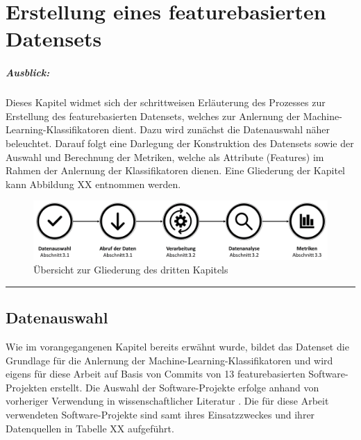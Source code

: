 
\chapter{Erstellung eines featurebasierten Datensets}

\paragraph{Ausblick:}
Dieses Kapitel widmet sich der schrittweisen Erläuterung des Prozesses zur Erstellung des featurebasierten Datensets, welches zur Anlernung der Machine-Learning-Klassifikatoren dient. Dazu wird zunächst die Datenauswahl näher beleuchtet. Darauf folgt eine Darlegung der Konstruktion des Datensets sowie der Auswahl und Berechnung der Metriken, welche als Attribute (Features) im Rahmen der Anlernung der Klassifikatoren dienen. Eine Gliederung der Kapitel kann Abbildung XX entnommen werden.

\begin{figure}[H]
    \centering
    \includegraphics[width=\textwidth]{images/Kap3}
    \caption{Übersicht zur Gliederung des dritten Kapitels\label{fig:kap3}}
\end{figure}

\hrule

\section{Datenauswahl}

Wie im vorangegangenen Kapitel bereits erwähnt wurde, bildet das Datenset die Grundlage für die Anlernung der Machine-Learning-Klassifikatoren und wird eigens für diese Arbeit auf Basis von Commits von 13 featurebasierten Software-Projekten erstellt. Die Auswahl der Software-Projekte erfolge anhand von vorheriger Verwendung in wissenschaftlicher Literatur \cite{Hunsen2015,Liebig2010,Queiroz2016}. Die für diese Arbeit verwendeten Software-Projekte sind samt ihres Einsatzzweckes und ihrer Datenquellen in Tabelle XX aufgeführt.

